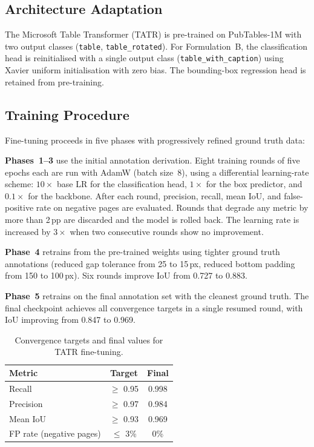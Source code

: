 \documentclass[pdflatex,sn-mathphys-num,iicol]{sn-jnl}
\begin{document}
\begin{appendices}
\subsection*{Architecture Adaptation}

The Microsoft Table Transformer (TATR) is pre-trained on PubTables-1M with two
output classes (\texttt{table}, \texttt{table\_rotated}). For Formulation~B, the
classification head is reinitialised with a single output class
(\texttt{table\_with\_caption}) using Xavier uniform initialisation with zero bias.
The bounding-box regression head is retained from pre-training.

\subsection*{Training Procedure}

Fine-tuning proceeds in five phases with progressively refined ground truth
data:\vspace{0.3em}

\noindent\textbf{Phases~1--3} use the initial annotation derivation. Eight training
rounds of five epochs each are run with AdamW (batch size~8), using a differential
learning-rate scheme: $10\times$ base LR for the classification head, $1\times$ for
the box predictor, and $0.1\times$ for the backbone. After each round, precision,
recall, mean IoU, and false-positive rate on negative pages are evaluated. Rounds
that degrade any metric by more than 2\,pp are discarded and the model is rolled
back. The learning rate is increased by $3\times$ when two consecutive rounds show
no improvement.\vspace{0.3em}

\noindent\textbf{Phase~4} retrains from the pre-trained weights using tighter ground
truth annotations (reduced gap tolerance from 25 to 15\,px, reduced bottom padding
from 150 to 100\,px). Six rounds improve IoU from 0.727 to 0.883.\vspace{0.3em}

\noindent\textbf{Phase~5} retrains on the final annotation set with the cleanest
ground truth. The final checkpoint achieves all convergence targets in a single
resumed round, with IoU improving from 0.847 to 0.969.

\begin{table}[ht!]
\caption{Convergence targets and final values for TATR fine-tuning.}
\label{tab:training_targets}
\footnotesize\setlength{\tabcolsep}{3pt}
\begin{tabular}{@{}lcc@{}}
\toprule
\textbf{Metric} & \textbf{Target} & \textbf{Final} \\
\midrule
Recall & $\geq$ 0.95 & 0.998 \\
Precision & $\geq$ 0.97 & 0.984 \\
Mean IoU & $\geq$ 0.93 & 0.969 \\
FP rate (negative pages) & $\leq$ 3\% & 0\% \\
\bottomrule
\end{tabular}
\end{table}


\end{appendices}
\end{document}
